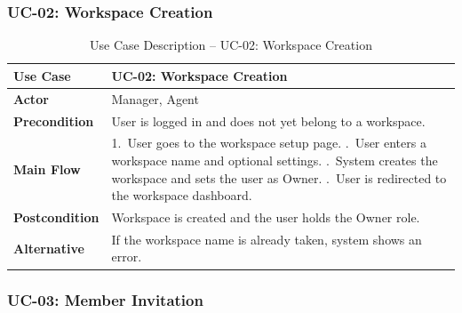 \documentclass[12pt,a4paper]{report}
\begin{document}
\subsubsection{UC-02: Workspace Creation}

\begin{table}[H]
  \centering
  \renewcommand{\arraystretch}{1.3}
  \begin{tabular}{|>{\bfseries}p{3.5cm}|p{10cm}|}
    \hline
    Use Case      & UC-02: Workspace Creation \\
    \hline
    Actor         & Manager, Agent \\
    \hline
    Precondition  & User is logged in and does not yet belong to a workspace. \\
    \hline
    Main Flow     & 1.\ User goes to the workspace setup page. \newline
                    2.\ User enters a workspace name and optional settings. \newline
                    3.\ System creates the workspace and sets the user as Owner. \newline
                    4.\ User is redirected to the workspace dashboard. \\
    \hline
    Postcondition & Workspace is created and the user holds the Owner role. \\
    \hline
    Alternative   & If the workspace name is already taken, system shows an error. \\
    \hline
  \end{tabular}
  \caption{Use Case Description -- UC-02: Workspace Creation}
  \label{tab:uc02}
\end{table}

\subsubsection{UC-03: Member Invitation}
\end{document}
